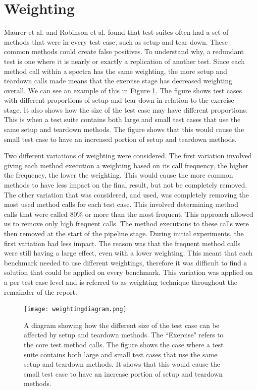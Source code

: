\section{Weighting }
Maurer et al. \cite{koochakzadeh2009test} and Robinson et al. \cite{li2008static} found that test suites often had a set of methods that were in every test case, such as setup and tear down. These common methods could create false positives. To understand why, a redundant test is one where it is nearly or exactly a replication of another test. Since each method call within a spectra has the same weighting, the more setup and teardown calls made means that the exercise stage has decreased weighting overall. We can see an example of this in Figure \ref{fig:weightingdiagram}. The figure shows test cases with different proportions of setup and tear down in relation to the exercise stage. It also shows how the size of the test case may have different proportions. This is when a test suite contains both large and small test cases that use the same setup and teardown methods. The figure shows that this would cause the small test case to have an increased portion of setup and teardown methods.

Two different variations of weighting were considered. The first variation involved giving each method execution a weighting based on its call frequency, the higher the frequency, the lower the weighting. This would cause the more common methods to have less impact on the final result, but not be completely removed. The other variation that was considered, and used, was completely removing the most used method calls for each test case. This involved determining method calls that were called 80\% or more than the most frequent. This approach allowed us to remove only high frequent calls. The method executions to these calls were then removed at the start of the pipeline stage. During initial experiments, the first variation had less impact. The reason was that the frequent method calls were still having a large effect, even with a lower weighting. This meant that each benchmark needed to use different weightings, therefore it was difficult to find a solution that could be applied on every benchmark. This variation was applied on a per test case level and is referred to as weighting technique throughout the remainder of the report.

\begin{figure}[h]
\texttt{[image: weightingdiagram.png]}
\caption{A diagram showing how the different size of the test case can be affected by setup and teardown methods. The ``Exercise" refers to the core test method calls. The figure shows the case where a test suite contains both large and small test cases that use the same setup and teardown methods. It shows that this would cause the small test case to have an increase portion of setup and teardown methods. }
\label{fig:weightingdiagram}
\end{figure}

